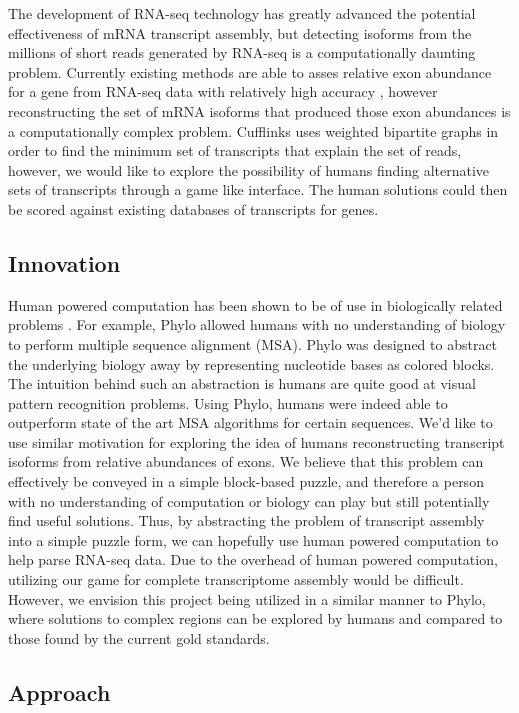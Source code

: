\documentclass[12pt]{article}
\begin{document}
The development of RNA-seq technology has greatly advanced the potential effectiveness of mRNA transcript assembly, but detecting isoforms from the millions of short reads generated by RNA-seq is a computationally daunting problem. Currently existing methods are able to asses relative exon abundance for a gene from RNA-seq data with relatively high accuracy \citep{trapnell2009tophat}, however reconstructing the set of mRNA isoforms that produced those exon abundances is a computationally complex problem. Cufflinks uses weighted bipartite graphs in order to find the minimum set of transcripts that explain the set of reads, however, we would like to explore the possibility of humans finding alternative sets of transcripts through a game like interface. The human solutions could then be scored against existing databases of transcripts for genes.

\subsection*{Innovation}
Human powered computation has been shown to be of use in biologically related problems \citep{kawrykow2012phylo, cooper2010predicting}. For example, Phylo allowed humans with no understanding of biology to perform multiple sequence alignment (MSA). Phylo was designed to abstract the underlying biology away by representing nucleotide bases as colored blocks.  The intuition behind such an abstraction is humans are quite good at visual pattern recognition problems. Using Phylo, humans were indeed able to outperform state of the art MSA algorithms for certain sequences. We'd like to use similar motivation for exploring the idea of humans reconstructing transcript isoforms from relative abundances  of exons. We believe that this problem can effectively be conveyed in a simple block-based puzzle, and therefore a person with no understanding of computation or biology can play but still potentially find useful solutions. Thus, by abstracting the problem of transcript assembly into a simple puzzle form, we can hopefully use human powered computation to help parse RNA-seq data. Due to the overhead of human powered computation, utilizing our game for complete transcriptome assembly would be difficult. However, we envision
this project being utilized in a similar manner to Phylo, where solutions to complex regions can be explored by humans and compared to those found by the current gold standards.

\subsection*{Approach}
\end{document}
